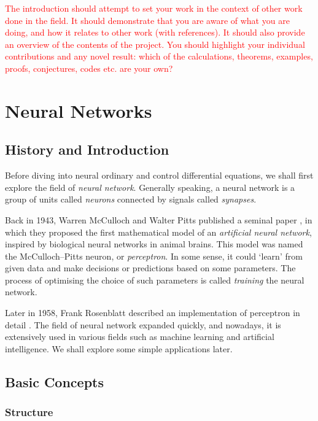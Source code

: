 \documentclass[a4paper,11pt, titlepage]{article}
\theoremstyle{definition}
\theoremstyle{plain}
\theoremstyle{remark}
\begin{document}
\textcolor{red}{The introduction should attempt to set your work in the context of other work done in the field. It
should demonstrate that you are aware of what you are doing, and how it relates to other work
(with references). It should also provide an overview of the contents of the project. You should
highlight your individual contributions and any novel result: which of the calculations, theorems,
examples, proofs, conjectures, codes etc. are your own?}

\section{Neural Networks}

\subsection{History and Introduction}

Before diving into neural ordinary and control differential equations, we shall first explore the field of \textit{neural network}. Generally speaking, a neural network is a group of units called \textit{neurons} connected by signals called \textit{synapses}.

Back in 1943, Warren McCulloch and Walter Pitts published a seminal paper \cite{McCulloch1943}, in which they proposed the first mathematical model of an \textit{artificial neural network}, inspired by biological neural networks in animal brains. This model was named the McCulloch–Pitts neuron, or \textit{perceptron}. In some sense, it could ‘learn’ from given data and make decisions or predictions based on some parameters. The process of optimising the choice of such parameters is called \textit{training} the neural network.

Later in 1958, Frank Rosenblatt described an implementation of perceptron in detail \cite{Rosenblatt1958}. The field of neural network expanded quickly, and nowadays, it is extensively used in various fields such as machine learning and artificial intelligence. We shall explore some simple applications later.

\subsection{Basic Concepts}

\subsubsection{Structure}
\end{document}
